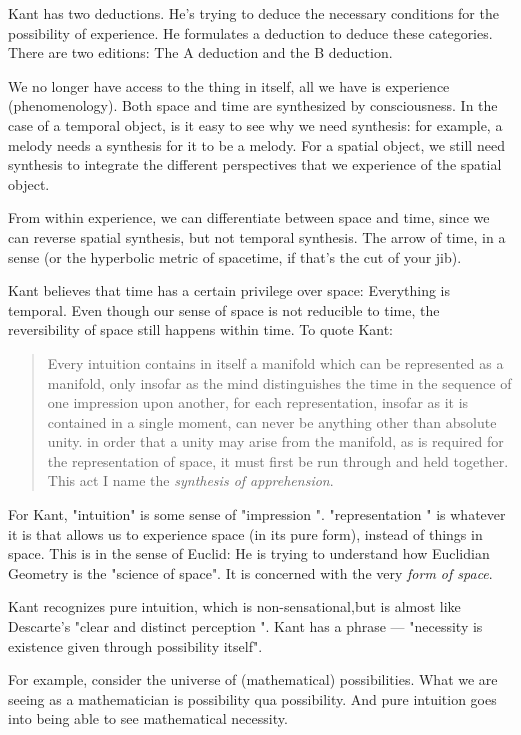 \documentclass[11pt]{book}
\begin{document}
Kant has two deductions. He's trying to deduce the necessary conditions for
the possibility of experience. He formulates a deduction to deduce these categories.
There are two editions: The A deduction and the B deduction.

We no longer have access to the thing in itself, all we have is
experience (phenomenology). Both space and time are synthesized by consciousness.
In the case of a temporal object, is it easy to see why 
we need synthesis: for example, a melody needs a synthesis for it to be a melody.
For a spatial object, we still need synthesis to integrate the different
perspectives that we experience of the spatial object. 

From within experience, we can differentiate between space and time, since we can
reverse spatial synthesis, but not temporal synthesis. The arrow of time, in a
sense (or the hyperbolic metric of spacetime, if that's the cut of your jib).

Kant believes that time has a certain privilege over space: Everything is temporal.
Even though our sense of space is not reducible to time, the reversibility of space
still happens within time. To quote Kant:

\begin{quote}
	Every intuition contains in itself a manifold which can be represented
	as a manifold, only insofar as the mind distinguishes the time in the
	sequence of one impression upon another, for each representation, insofar
	as it is contained in a single moment, can never be anything other than
	absolute unity. in order that a unity may arise from the manifold, as is required
	for the representation of space, it must first be run through and
	held together. This act I name the \emph{synthesis of apprehension}.
\end{quote}

For Kant, "intuition" is some sense of "impression ". "representation "
is whatever it is that 
allows us to experience space (in its pure form), instead of things in space. This
is in the sense of Euclid: He is trying to understand how Euclidian Geometry
is the "science of space". It is concerned with the very \emph{form of space}.

Kant recognizes pure intuition, which is non-sensational,but is almost like 
Descarte's "clear and distinct perception ". Kant has a phrase --- 
"necessity is existence given through possibility itself".

For example, consider the universe of (mathematical) possibilities. What
we are seeing as a mathematician is possibility qua possibility. And pure 
intuition goes into being able to see mathematical necessity.
\end{document}
